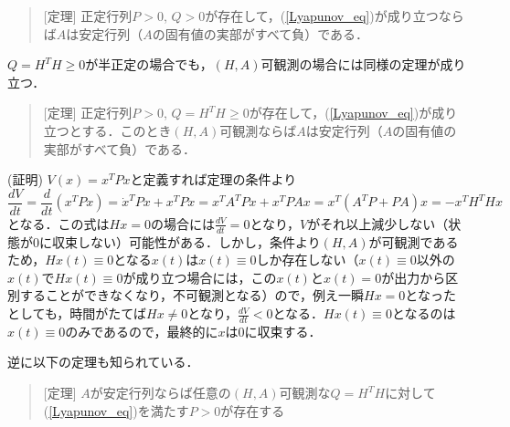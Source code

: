 \begin{quote}
[定理] 正定行列$P>0$, $Q>0$が存在して，(\ref{Lyapunov_eq})が成り立つならば$A$は安定行列（$A$の固有値の実部がすべて負）である．
\end{quote}

$Q=H^T H \geq 0$が半正定の場合でも，$(H,A)$可観測の場合には同様の定理が成り立つ．

\begin{quote}
[定理] 正定行列$P>0$, $Q=H^T H \geq 0$が存在して，(\ref{Lyapunov_eq})が成り立つとする．このとき$(H,A)$可観測ならば$A$は安定行列（$A$の固有値の実部がすべて負）である．
\end{quote}

\noindent
(証明) 
$V(x)= x^T P x$と定義すれば定理の条件より
\begin{equation}
 \frac{d V}{d t} = \frac{d}{dt} (x^T P x) = \dot{x}^T P x + x^T P \dot{x} = x^T A^T P x + x^T P A x = x^T (A^T P + P A) x = - x^T H^T H x
\end{equation}
となる．この式は$Hx=0$の場合には$\frac{d V}{d t}=0$となり，$V$がそれ以上減少しない（状態が$0$に収束しない）可能性がある．しかし，条件より$(H,A)$が可観測であるため，$Hx(t) \equiv 0$となる$x(t)$は$x(t) \equiv 0$しか存在しない（$x(t) \equiv 0$以外の$x(t)$で$H x(t) \equiv 0$が成り立つ場合には，この$x(t)$と$x(t)=0$が出力から区別することができなくなり，不可観測となる）ので，例え一瞬$Hx=0$となったとしても，時間がたてば$Hx \neq 0$となり，$\frac{d V}{dt}<0$となる．$Hx(t) \equiv 0$となるのは$x(t) \equiv 0$のみであるので，最終的に$x$は$0$に収束する．



逆に以下の定理も知られている．

\begin{quote}
[定理] $A$が安定行列ならば任意の$(H,A)$可観測な$Q=H^T H$に対して(\ref{Lyapunov_eq})を満たす$P>0$が存在する
\end{quote}

